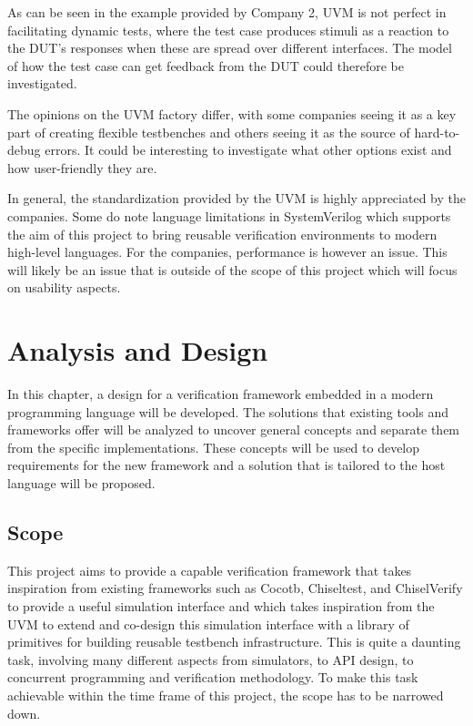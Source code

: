 As can be seen in the example provided by Company 2, UVM is not perfect in facilitating dynamic tests, where the
test case produces stimuli as a reaction to the DUT's responses when these are spread over different interfaces. The
model of how the test case can get feedback from the DUT could therefore be investigated.

The opinions on the UVM factory differ, with some companies seeing it as a key part of creating flexible testbenches
and others seeing it as the source of hard-to-debug errors. It could be interesting to investigate what other options
exist and how user-friendly they are.

In general, the standardization provided by the UVM is highly appreciated by the companies. Some do note language limitations in SystemVerilog which supports the aim of this project to bring reusable verification environments to modern high-level languages. For the companies, performance is however an issue. This will likely be an issue that is outside of the scope of this project which will focus on usability aspects.


\chapter{Analysis and Design} %

In this chapter, a design for a verification framework embedded in a modern programming language will be developed.
The solutions that existing tools and frameworks offer will be analyzed to uncover general concepts and separate them
from the specific implementations. These concepts will be used to develop requirements for the new framework and a
solution that is tailored to the host language will be proposed.

\section{Scope} %

This project aims to provide a capable verification framework that takes inspiration from existing frameworks such as Cocotb, Chiseltest, and ChiselVerify to provide a useful simulation interface and which takes inspiration from the UVM to extend and co-design this simulation interface with a library of primitives for building reusable testbench infrastructure. This is quite a daunting task, involving many different aspects from simulators, to API design, to concurrent programming and verification methodology. To make this task achievable within the time frame of this project, the scope has to be narrowed down.

